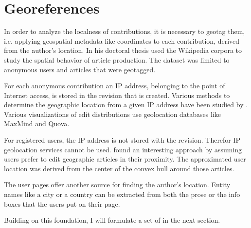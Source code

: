 \section{Georeferences}\label{sec:georeference}

In order to analyze the localness of contributions, it is necessary to geotag them, i.e. applying geospatial metadata like coordinates to each contribution, derived from the author's location.
In his doctoral thesis \textcite{hardy2011volunteered} used the Wikipedia corpora to study the spatial behavior of article production.
The dataset was limited to anonymous users and articles that were geotagged.

For each anonymous contribution an \ac{IP} address, belonging to the point of Internet access, is stored in the revision that is created.
Various methods to determine the geographic location from a given \ac{IP} address have been studied by \textcite{muir2009internet}.
Various visualizations  of edit distributions use geolocation databases like MaxMind and Quova.

For registered users, the \ac{IP} address is not stored with the revision.
Therefor \ac{IP} geolocation services cannot be used.
\textcite{lieberman2009you} found an interesting approach by assuming users prefer to edit geographic articles in their proximity.
The approximated user location was derived from the center of the convex hull around those articles.

The user pages offer another source for finding the author's location.
Entity names like a city or a country can be extracted from both the prose or the info boxes that the users put on their page.

Building on this foundation, I will formulate a set of  in the next section.